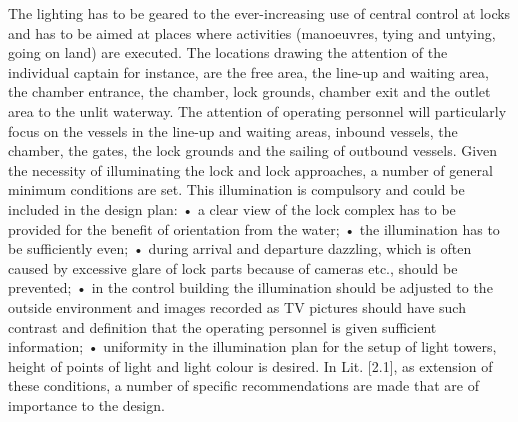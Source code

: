 The lighting has to be geared to the ever-increasing use of central control at locks and has to be aimed
at places where activities (manoeuvres, tying and untying, going on land) are executed.
The locations drawing the attention of the individual captain for instance, are the free area, the line-up
and waiting area, the chamber entrance, the chamber, lock grounds, chamber exit and the outlet area
to the unlit waterway. The attention of operating personnel will particularly focus on the vessels in the
line-up and waiting areas, inbound vessels, the chamber, the gates, the lock grounds and the sailing of
outbound vessels.
Given the necessity of illuminating the lock and lock approaches, a number of general minimum conditions
are set. This illumination is compulsory and could be included in the design plan:
• a clear view of the lock complex has to be provided for the benefit of orientation from the water;
• the illumination has to be sufficiently even;
• during arrival and departure dazzling, which is often caused by excessive glare of lock parts because
of cameras etc., should be prevented;
• in the control building the illumination should be adjusted to the outside environment and images
recorded as TV pictures should have such contrast and definition that the operating personnel is given
sufficient information;
• uniformity in the illumination plan for the setup of light towers, height of points of light and light
colour is desired.
In Lit. [2.1], as extension of these conditions, a number of specific recommendations are made that are
of importance to the design.

